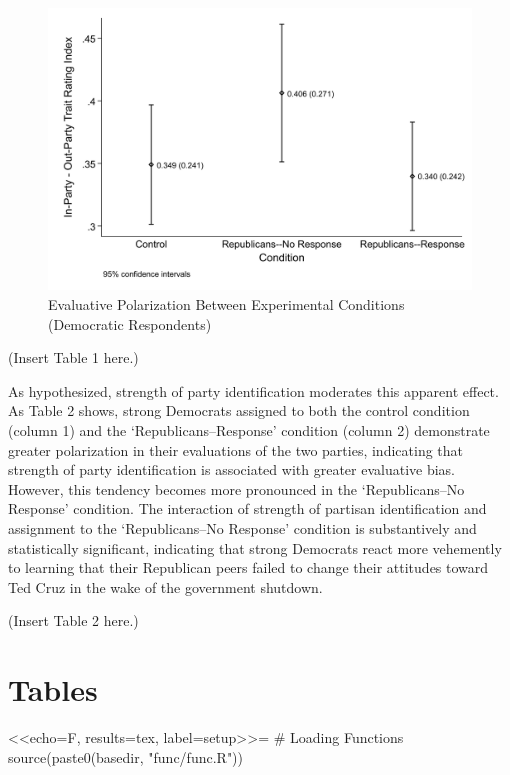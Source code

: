 \documentclass[12pt]{article}
\begin{document}
\begin{figure}
\caption{Evaluative Polarization Between Experimental Conditions (Democratic Respondents)}
\begin{center}
\includegraphics[scale=0.3]{ciplot_dems_on_reps.pdf}
\end{center}
\end{figure}

\centerline{(Insert Table 1 here.)}

As hypothesized, strength of party identification moderates this apparent effect. As Table 2 shows, strong Democrats assigned to both the control condition (column 1) and the `Republicans--Response' condition (column 2) demonstrate greater polarization in their evaluations of the two parties, indicating that strength of party identification is associated with greater evaluative bias. However, this tendency becomes more pronounced in the `Republicans--No Response' condition. The interaction of strength of partisan identification and assignment to the `Republicans--No Response' condition is substantively and statistically significant, indicating that strong Democrats react more vehemently to learning that their Republican peers failed to change their attitudes toward Ted Cruz in the wake of the government shutdown. 

\centerline{(Insert Table 2 here.)}


\clearpage
\singlespacing
\nocite{BullockEtAl2013}


  

\clearpage 
\section*{Tables}
<<echo=F, results=tex, label=setup>>=
# Loading Functions
	source(paste0(basedir, "func/func.R"))
\end{document}
